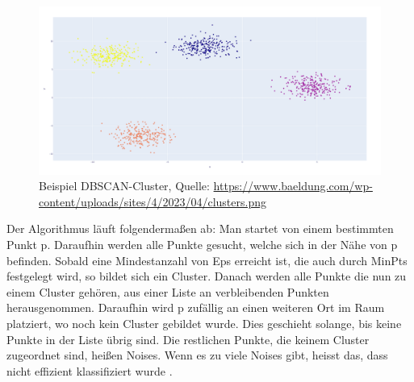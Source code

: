 \documentclass[a4paper,12pt]{article}
\begin{document}
	\begin{figure}[H]
		\centering
		\includegraphics[width=0.9\linewidth]{screenshot015}
		\caption{Beispiel DBSCAN-Cluster, Quelle: \url{https://www.baeldung.com/wp-content/uploads/sites/4/2023/04/clusters.png}}
		\label{fig:screenshot015}
	\end{figure}
	
	Der Algorithmus läuft folgendermaßen ab:
	Man startet von einem bestimmten Punkt p. Daraufhin werden alle Punkte gesucht, welche sich in der Nähe von p befinden. Sobald eine Mindestanzahl von Eps erreicht ist, die auch durch MinPts festgelegt wird, so bildet sich ein Cluster. Danach werden alle Punkte die nun zu einem Cluster gehören, aus einer Liste an verbleibenden Punkten herausgenommen. Daraufhin wird p zufällig an einen weiteren Ort im Raum platziert, wo noch kein Cluster gebildet wurde. Dies geschieht solange, bis keine Punkte in der Liste übrig sind. Die restlichen Punkte, die keinem Cluster zugeordnet sind, heißen Noises. Wenn es zu viele Noises gibt, heisst das, dass nicht effizient klassifiziert wurde \cite{ester1996dbscan}. 
	
\end{document}
